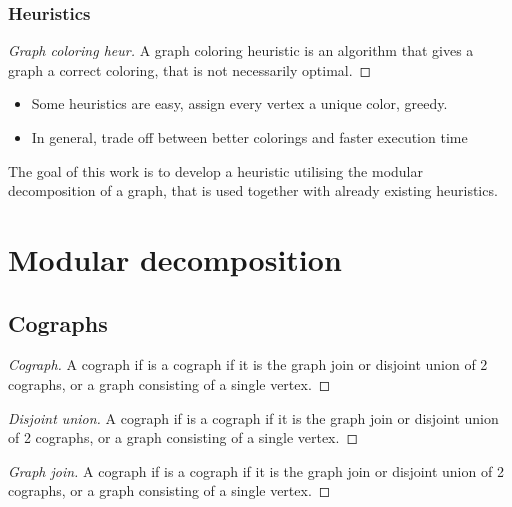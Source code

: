 \documentclass[11pt]{beamer}
\begin{document}
\begin{frame}
    \frametitle{Heuristics}
    \begin{proof}[Graph coloring heur]
        A graph coloring heuristic is an algorithm that gives a graph a correct coloring, that is not necessarily optimal.
    \end{proof}
    \begin{itemize}
        \item<1-> Some heuristics are easy, assign every vertex a unique color, greedy.
        \item<2-> In general, trade off between better colorings and faster execution time
    \end{itemize}

\end{frame}

\begin{frame}
    
    The goal of this work is to develop a heuristic utilising the modular
    decomposition of a graph, that is used together with already existing heuristics.
    
\end{frame}

\section{Modular decomposition}

\subsection{Cographs}
\begin{frame}
    \begin{proof}[Cograph]
        A cograph if is a cograph if it is the graph join or disjoint union of 2
        cographs, or a graph consisting of a single vertex.
    \end{proof}
    \begin{proof}[Disjoint union]
        A cograph if is a cograph if it is the graph join or disjoint union of 2
        cographs, or a graph consisting of a single vertex.
    \end{proof}
    \begin{proof}[Graph join]
        A cograph if is a cograph if it is the graph join or disjoint union of 2
        cographs, or a graph consisting of a single vertex.
    \end{proof}

\end{frame}
\end{document}
